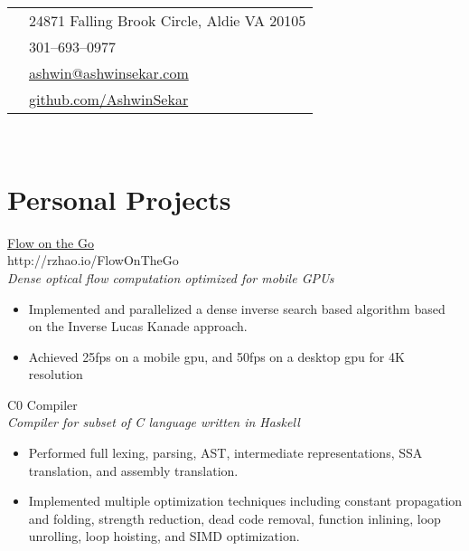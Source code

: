 \documentclass[10pt]{article} %
\begin{document}
{\begin{minipage}[t]{0.44\textwidth}
\colorbox{shade}{\textcolor{text1}{\begin{tabular}{cp{7cm}}
      \raisebox{-2pt}{\textifsymbol{18}} & 24871 Falling Brook Circle, Aldie VA 20105 \\ %
      \raisebox{0pt}{\Mobilefone} & 301--693--0977 \\ %
      \raisebox{0pt}{\Letter} & \href{mailto:ashwin@ashwinsekar.com}{ashwin@ashwinsekar.com} \\ %
      \raisebox{0pt}{\Keyboard} & \href{https://github.com/AshwinSekar}{github.com/AshwinSekar} \\ %
    \end{tabular}
  }
}\\[10pt]




\section{Personal Projects}

{\raggedright\large \href{http://rzhao.io/FlowOnTheGo/}{Flow on the Go} \\ {\small http://rzhao.io/FlowOnTheGo} \\
{\small \textit{Dense optical flow computation optimized for mobile GPUs}}\\[5pt]}

\normalsize
  \begin{itemize}
    \item Implemented and parallelized a dense inverse search based algorithm based on the Inverse Lucas Kanade approach.
    \item Achieved 25fps on a mobile gpu, and 50fps on a desktop gpu for 4K resolution
  \end{itemize}


{\raggedright\large C0 Compiler \\
  {\small\textit{Compiler for subset of C language written in Haskell}}\\[5pt]}

\normalsize
  \begin{itemize}
    \item 
      Performed full lexing, parsing, AST, intermediate representations, SSA translation, and assembly translation.
    \item
      Implemented multiple optimization techniques including constant propagation and folding, strength reduction,
      dead code removal, function inlining, loop unrolling, loop hoisting, and SIMD optimization.
  \end{itemize}





\end{minipage}}
\end{document}
